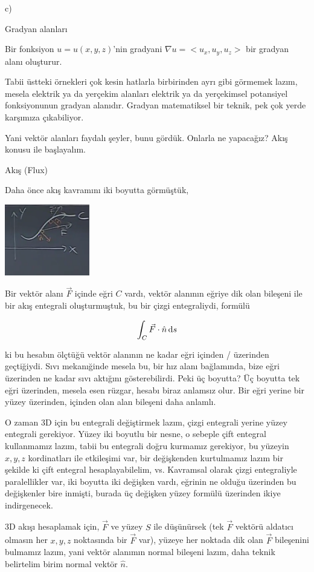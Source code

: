 \documentclass[12pt,fleqn]{article}\usepackage{../../common}
\begin{document}
c)

Gradyan alanları

Bir fonksiyon $u = u(x,y,z)$'nin gradyani $\nabla u = < u_x, u_y, u_z >$
bir gradyan alanı oluşturur.

Tabii üstteki örnekleri çok kesin hatlarla birbirinden ayrı gibi görmemek lazım,
mesela elektrik ya da yerçekim alanları elektrik ya da yerçekimsel potansiyel
fonksiyonunun gradyan alanıdır. Gradyan matematiksel bir teknik, pek çok
yerde karşımıza çıkabiliyor.

Yani vektör alanları faydalı şeyler, bunu gördük. Onlarla ne yapacağız?
Akış konusu ile başlayalım.

Akış (Flux)

Daha önce akış kavramını iki boyutta görmüştük,

\includegraphics[width=10em]{calc_multi_27_02.png}

Bir vektör alanı $\vec{F}$ içinde eğri $C$ vardı, vektör alanının
eğriye dik olan bileşeni ile bir akış entegrali oluşturmuştuk, bu
bir çizgi entegraliydi, formülü

$$
\int_C \vec{F} \cdot \hat{n} \,\mathrm{d} s
$$

ki bu hesabın ölçtüğü vektör alanının ne kadar eğri içinden / üzerinden
geçtiğiydi. Sıvı mekanığinde mesela bu, bir hız alanı bağlamında, bize eğri
üzerinden ne kadar sıvı aktığını gösterebilirdi. Peki üç boyutta? Üç boyutta tek
eğri üzerinden, mesela esen rüzgar, hesabı biraz anlamsız olur. Bir eğri yerine
bir yüzey üzerinden, içinden olan alan bileşeni daha anlamlı.

O zaman 3D için bu entegrali değiştirmek lazım, çizgi entegrali yerine yüzey
entegrali gerekiyor.  Yüzey iki boyutlu bir nesne, o sebeple çift entegral
kullanmamız lazım, tabii bu entegrali doğru kurmamız gerekiyor, bu yüzeyin
$x,y,z$ kordinatları ile etkileşimi var, bir değişkenden kurtulmamız lazım bir
şekilde ki çift entegral hesaplayabilelim, vs. Kavramsal olarak çizgi
entegraliyle paralellikler var, iki boyutta iki değişken vardı, eğrinin ne
olduğu üzerinden bu değişkenler bire inmişti, burada üç değişken yüzey formülü
üzerinden ikiye indirgenecek.

3D akışı hesaplamak için, $\vec{F}$ ve yüzey $S$ ile düşünürsek (tek $\vec{F}$
vektörü aldatıcı olmasın her $x,y,z$ noktasında bir $\vec{F}$ var), yüzeye
her noktada dik olan $\vec{F}$ bileşenini bulmamız lazım, yani vektör alanımın
normal bileşeni lazım, daha teknik belirtelim birim normal vektör $\hat{n}$.
\end{document}
